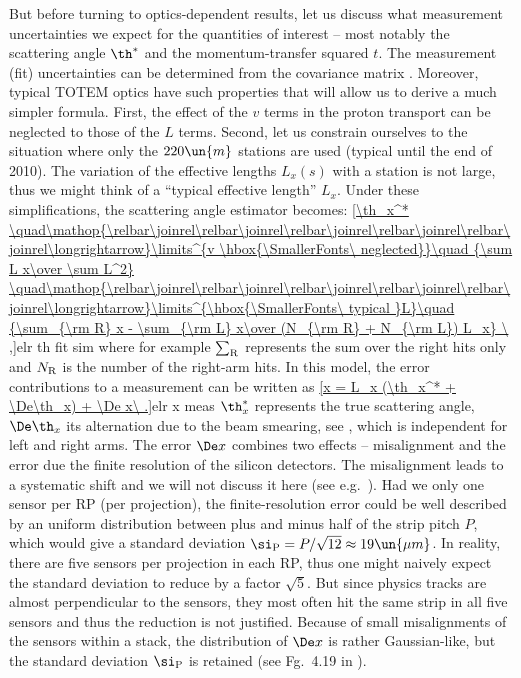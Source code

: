 But before turning to optics-dependent results, let us discuss what measurement uncertainties we expect for the quantities of interest -- most notably the scattering angle $\th^*$ and the momentum-transfer squared $t$. The measurement (fit) uncertainties can be determined from the covariance matrix . Moreover, typical TOTEM optics
have such properties that will allow us to derive a much simpler formula. First, the effect of the $v$ terms in the proton transport  can be neglected to those of the $L$ terms. Second, let us constrain ourselves to the situation where only the $220\un{m}$ stations are used (typical until the end of 2010). The variation of the effective lengths $L_x(s)$ with a station is not large, thus we might think of a ``typical effective length'' $L_x$. Under these simplifications, the scattering angle estimator becomes:
\eqref{\th_x^*
	\quad\mathop{\relbar\joinrel\relbar\joinrel\relbar\joinrel\relbar\joinrel\relbar\joinrel\longrightarrow}\limits^{v \hbox{\SmallerFonts\ neglected}}\quad
		{\sum L x\over \sum L^2}
	\quad\mathop{\relbar\joinrel\relbar\joinrel\relbar\joinrel\relbar\joinrel\relbar\joinrel\longrightarrow}\limits^{\hbox{\SmallerFonts\ typical }L}\quad
	{\sum_{\rm R} x - \sum_{\rm L} x\over (N_{\rm R} + N_{\rm L}) L_x}
\ ,}{elr th fit sim} 
where for example $\sum_{\rm R}$ represents the sum over the right hits only and $N_{\rm R}$ is the number of the right-arm hits. In this model, the error contributions to a measurement can be written as
\eqref{x = L_x (\th_x^* + \De\th_x) + \De x\ .}{elr x meas}
$\th_x^*$ represents the true scattering angle, $\De\th_x$ its alternation due to the beam smearing, see , which is independent for left and right arms. The error $\De x$ combines two effects -- misalignment and the error due the finite resolution of the silicon detectors. The misalignment leads to a systematic shift and we will not discuss it here (see e.g.~). Had we only one sensor per RP (per projection), the finite-resolution error could be well described by an uniform distribution between plus and minus half of the strip pitch $P$, which would give a standard deviation $\si_{\rm P} = P/\sqrt{12}\approx 19\un{\mu m}$. In reality, there are five sensors per projection in each RP, thus one might naively expect the standard deviation to reduce by a factor $\sqrt 5$. But since physics tracks are almost perpendicular to the sensors, they most often hit the same strip in all five sensors and thus the reduction is not justified. Because of small misalignments of the sensors within a stack, the distribution of $\De x$ is rather Gaussian-like, but the standard deviation $\si_{\rm P}$ is retained (see Fg.~4.19 in ).

